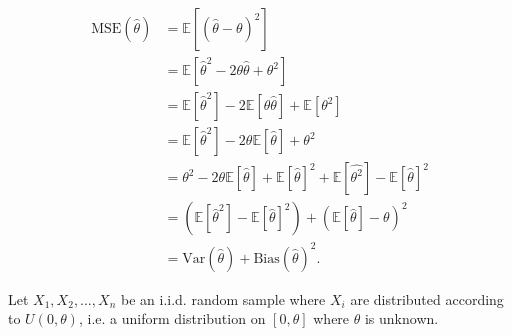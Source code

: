 \documentclass[answers]{exam}
\begin{document}
\begin{questions}
\begin{solution}
\begin{align*}
\text{MSE}(\hat{\theta}) &= \mathbb{E}[(\hat{\theta}-\theta)^2] \\ 
&= \mathbb{E}[\hat{\theta}^2 - 2\theta \hat{\theta} + \theta^2] \\ 
&= \mathbb{E}[\hat{\theta}^2] - 2\mathbb{E}[\theta \hat{\theta}] + \mathbb{E}[\theta^2] \\ 
&= \mathbb{E}[\hat{\theta}^2] - 2\theta\mathbb{E}[\hat{\theta}] + \theta^2 \\ 
&= \theta^2 - 2\theta\mathbb{E}[\hat{\theta}] + \mathbb{E}[\hat{\theta}]^2 + \mathbb{E}[\hat{\theta^2}] - \mathbb{E}[\hat{\theta}]^2 \\ 
&= (\mathbb{E}[\hat{\theta}^2] - \mathbb{E}[\hat{\theta}]^2) + (\mathbb{E}[\hat{\theta}] - \theta)^2 \\ 
&= \text{Var}(\hat{\theta}) + \text{Bias}(\hat{\theta})^2
.\end{align*}
\end{solution}

\question [25] Let $X_1,X_2,\ldots,X_{n}$ be an i.i.d. random sample where 
$X_{i}$ are distributed according to $U(0,\theta)$, i.e. a uniform distribution
on $[0,\theta]$ where $\theta$ is unknown.

\end{questions}
\end{document}

